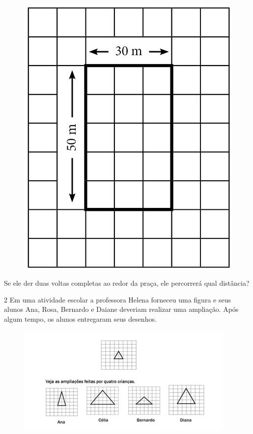 \begin{figure}[htpb!]
\centering
\includegraphics[width=.8\textwidth]{../ilustracoes/MAT5/SAEB_5ANO_MAT_figura35.png}
\end{figure}

Se ele der duas voltas completas ao redor da praça, ele percorrerá qual
distância?

\begin{emptybox}

\vspace{1cm}
\end{emptybox}

\pagebreak

\num{2} Em uma atividade escolar a professora Helena forneceu uma figura e
seus alunos Ana, Rosa, Bernardo e Daiane deveriam realizar uma ampliação. Após algum tempo, os alunos entregaram seus desenhos.

\begin{figure}[htpb!]
\includegraphics[width=\textwidth]{./imgs/mat5.png}
\end{figure}

